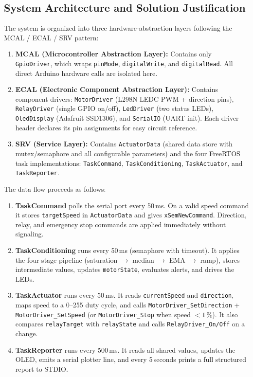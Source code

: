 \subsection{System Architecture and Solution Justification}

The system is organized into three hardware-abstraction layers following the MCAL /
ECAL / SRV pattern:

\begin{enumerate}
  \item \textbf{MCAL (Microcontroller Abstraction Layer):} Contains only
    \texttt{GpioDriver}, which wraps \texttt{pinMode}, \texttt{digitalWrite}, and
    \texttt{digitalRead}. All direct Arduino hardware calls are isolated here.
  \item \textbf{ECAL (Electronic Component Abstraction Layer):} Contains component
    drivers: \texttt{MotorDriver} (L298N LEDC PWM + direction pins),
    \texttt{RelayDriver} (single GPIO on/off), \texttt{LedDriver} (two status LEDs),
    \texttt{OledDisplay} (Adafruit SSD1306), and \texttt{SerialIO} (UART init).
    Each driver header declares its pin assignments for easy circuit reference.
  \item \textbf{SRV (Service Layer):} Contains \texttt{ActuatorData} (shared data
    store with mutex/semaphore and all configurable parameters) and the four FreeRTOS
    task implementations: \texttt{TaskCommand}, \texttt{TaskConditioning},
    \texttt{TaskActuator}, and \texttt{TaskReporter}.
\end{enumerate}

The data flow proceeds as follows:
\begin{enumerate}
  \item \textbf{TaskCommand} polls the serial port every 50\,ms. On a valid speed
    command it stores \texttt{targetSpeed} in \texttt{ActuatorData} and gives
    \texttt{xSemNewCommand}. Direction, relay, and emergency stop commands are
    applied immediately without signaling.
  \item \textbf{TaskConditioning} runs every 50\,ms (semaphore with timeout). It
    applies the four-stage pipeline (saturation $\to$ median $\to$ EMA $\to$ ramp),
    stores intermediate values, updates \texttt{motorState}, evaluates alerts, and
    drives the LEDs.
  \item \textbf{TaskActuator} runs every 50\,ms. It reads \texttt{currentSpeed} and
    \texttt{direction}, maps speed to a 0--255 duty cycle, and calls
    \texttt{MotorDriver\_SetDirection} + \texttt{MotorDriver\_SetSpeed} (or
    \texttt{MotorDriver\_Stop} when speed $< 1\,\%$). It also compares
    \texttt{relayTarget} with \texttt{relayState} and calls \texttt{RelayDriver\_On/Off}
    on a change.
  \item \textbf{TaskReporter} runs every 500\,ms. It reads all shared values, updates
    the OLED, emits a serial plotter line, and every 5\,seconds prints a full structured
    report to STDIO.
\end{enumerate}

